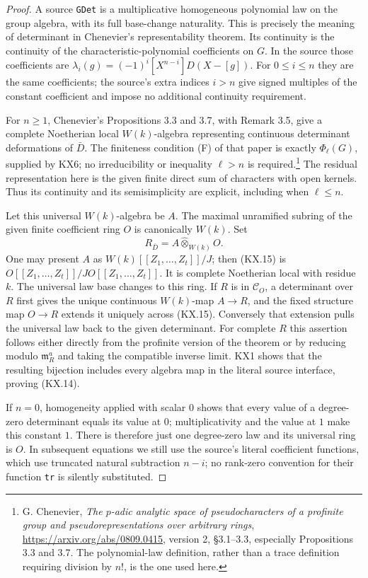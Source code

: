 \begin{proof}
A source \texttt{GDet} is a multiplicative homogeneous
polynomial law on the group algebra, with its full base-change
naturality.  This is precisely the meaning of determinant in
Chenevier's representability theorem.  Its continuity is the
continuity of the characteristic-polynomial coefficients on
$G$.  In the source those coefficients are
$\lambda_i(g)=(-1)^i[X^{n-i}]D(X-[g])$.  For $0\le i\le n$
they are the same coefficients; the source's extra indices
$i>n$ give signed multiples of the constant coefficient and impose
no additional continuity requirement.

For $n\ge1$, Chenevier's Propositions 3.3 and 3.7, with Remark 3.5,
give a complete Noetherian local $W(k)$-algebra representing
continuous determinant deformations of $\bar D$.
The finiteness condition (F) of that paper is exactly
$\Phi_\ell(G)$, supplied by KX6; no irreducibility or inequality
$\ell>n$ is required.\footnote{G. Chenevier,
\emph{The $p$-adic analytic space of pseudocharacters of a profinite
group and pseudorepresentations over arbitrary rings},
\url{https://arxiv.org/abs/0809.0415}, version 2,
\S3.1--3.3, especially Propositions 3.3 and 3.7.
The polynomial-law definition, rather than a trace definition
requiring division by $n!$, is the one used here.}
The residual representation here is the given finite direct sum
of characters with open kernels.  Thus its continuity and its
semisimplicity are explicit, including when $\ell\le n$.

Let this universal $W(k)$-algebra be $A$.  The maximal unramified
subring of the given finite coefficient ring $O$ is canonically
$W(k)$.  Set
\[
                    R_{\bar D}=A\widehat\otimes_{W(k)}O.
                                                               \tag{KX.15}
\]
One may present $A$ as $W(k)[[Z_1,\ldots,Z_t]]/J$;
then (KX.15) is $O[[Z_1,\ldots,Z_t]]/JO[[Z_1,\ldots,Z_t]]$.
It is complete Noetherian local with residue $k$.
The universal law base changes to this ring.  If $R$ is in
$\mathcal C_O$, a determinant over $R$ first gives the unique
continuous $W(k)$-map $A\to R$, and the fixed structure map
$O\to R$ extends it uniquely across (KX.15).  Conversely that
extension pulls the universal law back to the given determinant.
For complete $R$ this assertion follows either directly from the
profinite version of the theorem or by reducing modulo
$\mathfrak m_R^a$ and taking the compatible inverse limit.
KX1 shows that the resulting bijection includes every algebra map
in the literal source interface, proving (KX.14).

If $n=0$, homogeneity applied with scalar $0$ shows that every
value of a degree-zero determinant equals its value at $0$;
multiplicativity and the value at $1$ make this constant $1$.
There is therefore just one degree-zero law and its universal
ring is $O$.  In subsequent equations we still use the source's
literal coefficient functions, which use truncated natural
subtraction $n-i$; no rank-zero convention for their function
\texttt{tr} is silently substituted.
\end{proof}

